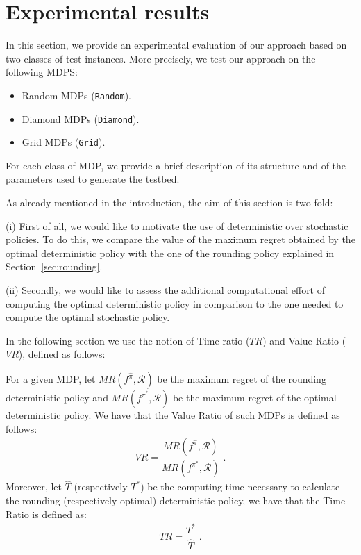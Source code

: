 \section{Experimental results}\label{sec:experiments}

In this section, we provide an experimental evaluation of our approach
based on two classes of test instances. More precisely, we test our approach on the following MDPS:
\begin{itemize}
\item Random MDPs (\texttt{Random}).
\item Diamond MDPs (\texttt{Diamond}).
\item Grid MDPs (\texttt{Grid}).
\end{itemize}


For each class of MDP, we provide a brief description of its structure and of the parameters used to generate the testbed.

As already mentioned in the introduction, the aim of this section is two-fold:

(i) First of all, we would like to motivate the use of deterministic over stochastic policies. To do this, we compare the value of the maximum regret obtained by the optimal deterministic policy with the one of the rounding policy explained in Section~\ref{sec:rounding}. 
%

(ii) Secondly, we would like to assess the additional computational effort of computing the optimal deterministic policy in comparison to the one needed to compute the optimal stochastic policy. 	 

In the following section we use the notion of Time ratio ($TR$) and Value Ratio ($VR$), defined as follows:

\begin{definition}
For a given MDP, let $MR(f^{\hat{\pi}}, \mathcal{R})$ be the maximum regret of the rounding deterministic policy and $MR(f^{\pi^*}, \mathcal{R})$  be the maximum regret of the optimal deterministic policy. We have that the Value Ratio of such MDPs is defined as follows:
\begin{align}
VR = \dfrac{MR(f^{\hat{\pi}}, \mathcal{R})}{MR(f^{\pi^*}, \mathcal{R})}\;.
\end{align} 
Moreover, let $\hat{T}$ (respectively $T^*$) be the computing time necessary to calculate the rounding (respectively optimal) deterministic policy, we have that the Time Ratio is defined as:
\begin{align}
TR=\dfrac{T^*}{\hat{T}}\;.
\end{align}
 
\end{definition}


